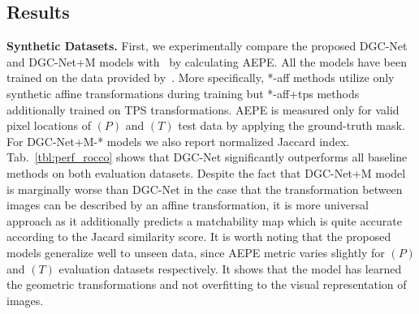 \documentclass[10pt,twocolumn,letterpaper]{article}
\begin{document}
\vspace{-1mm}
\subsection{Results}\label{ssec:results}
\noindent\textbf{Synthetic Datasets.} First, we experimentally compare the proposed DGC-Net and DGC-Net+M models with~\cite{Rocco17} by calculating AEPE. All the models have been trained on the data provided by~\cite{Rocco17}. More specifically, *-aff methods utilize only synthetic affine transformations during training but *-aff+tps methods additionally trained on TPS transformations. AEPE is measured only for valid pixel locations of $(P)$ and $(T)$ test data by applying the ground-truth mask. For DGC-Net+M-* models we also report normalized Jaccard index. Tab.~\ref{tbl:perf_rocco} shows that DGC-Net significantly outperforms all baseline methods on both evaluation datasets. Despite the fact that DGC-Net+M model is marginally worse than DGC-Net in the case that the transformation between images can be described by an affine transformation, it is more universal approach as it additionally predicts a matchability map which is quite accurate according to the Jacard similarity score. It is worth noting that the proposed models generalize well to unseen data, since AEPE metric varies slightly for $(P)$ and $(T)$ evaluation datasets respectively. It shows that the model has learned the geometric transformations and not overfitting to the visual representation of images.
\end{document}
